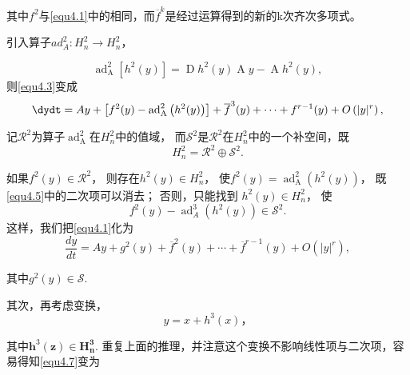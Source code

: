 其中\(f^2\)与\ref{equ4.1}中的相同，而\(\overline{f}^k\)是经过运算得到的新的k次齐次多项式。

引入算子$a d _ { A } ^ { 2 } : H _ { n } ^ { 2 } \rightarrow H _ { n } ^ { 2 }$，

\begin{equation}
\operatorname { ad } _ { \operatorname A } ^ { 2 } \left[ h ^ { 2 } ( y ) \right] = \operatorname { D } h ^ { 2 } ( y ) \operatorname A { y } - \operatorname A h ^ { 2 } ( y ),
\label{eq:1.4.4}
\end{equation}
则\ref{equ4.3}变成
\begin{equation}
    \label{eq:1.4.5}
\dydt= A y + \left[ f ^ { 2 } ( y ) - \operatorname { ad } _{\operatorname A}^2 \left( h ^ { 2 } ( y ) \right) \right] + \overline { f } ^ { 3 } ( y ) +\dots + f ^ { r - 1 } ( y ) + O \left( | y | ^ { r } \right),
\end{equation}

记$\mathscr { R } ^ { 2 }$为算子$\operatorname { ad } _ { \operatorname { A } } ^ { 2 }$在$H _ { n } ^ { 2 }$中的值域，
而$\mathscr{S}^2$是\(\mathscr{R}^2\)在\(H_n^2\)中的一个补空间，既
\[
H _ { n } ^ { 2 } = \mathscr { R } ^ { 2 } \oplus \mathscr { S }^2.
\]

如果$f ^ { 2 } ( y ) \in \mathscr { R } ^ { 2 }$，
则存在$h ^ { 2 } ( y ) \in H _ { n } ^ { 2 }$，
使$f ^ { 2 } ( y ) = \operatorname { ad } _ { \operatorname A } ^ { 2 } \left( h ^ { 2 } ( y ) \right)$，
既\ref{equ4.5}中的二次项可以消去；
否则，只能找到
$h^{2}(y) \in H_{n}^{2}$，
使
\begin{equation}
\label{eq:1.4.6}
f^{2}(y) - \operatorname { ad } _ { A } ^ { 3 } \left( h ^ { 2 } ( y ) \right) \in \mathscr{S}^2.
\end{equation}
这样，我们把\ref{equ4.1}化为
\begin{equation}
  \frac { d y } { d t } = A y + g ^ { 2 } ( y ) + \overline { f } ^ { 2 } ( y ) + \cdots + \overline { f } ^ { r - 1 } ( y ) + O \left( | y | ^ { r } \right),
  \label{eq:1.4.7}
\end{equation}

其中\(g^2(y) \in \mathscr{S}\).

其次，再考虑变换，
\begin{equation}
  \label{eq:1.4.8}
y = x + h ^ { 3 } ( x )，
\end{equation}

其中$\mathbf { h } ^ { 3 } ( \mathbf { z } ) \in \boldsymbol { H } _ { \boldsymbol { n } } ^ { \mathbf { 3 } }$.
重复上面的推理，并注意这个变换不影响线性项与二次项，容易得知\ref{equ4.7}变为

